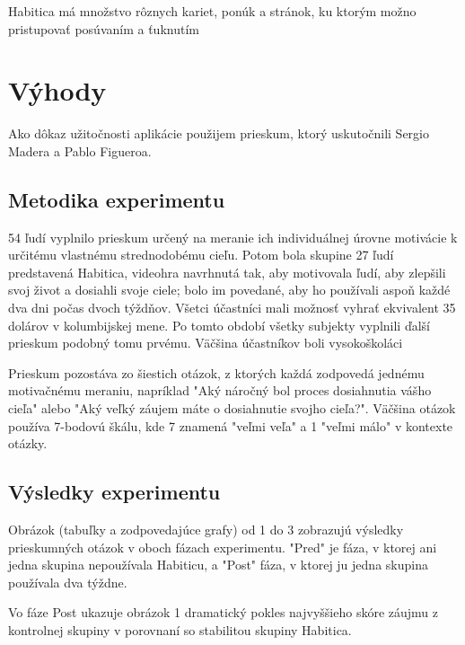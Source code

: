 \documentclass[10pt,twoside,slovak,a4paper]{article}
\begin{document}
Habitica má množstvo rôznych kariet, ponúk a stránok, ku ktorým možno pristupovať posúvaním a ťuknutím

\section{Výhody} \label{benefits}
Ako dôkaz užitočnosti aplikácie použijem prieskum, ktorý uskutočnili Sergio Madera a Pablo Figueroa.\cite{StudyOnPotentialOfVideogames}

\subsection{Metodika experimentu} \label{benefits:methodology}
54 ľudí vyplnilo prieskum určený na meranie ich individuálnej úrovne motivácie k určitému vlastnému strednodobému cieľu. 
Potom bola skupine 27 ľudí predstavená Habitica, videohra navrhnutá tak, aby motivovala ľudí, aby zlepšili svoj život a 
dosiahli svoje ciele; bolo im povedané, aby ho používali aspoň každé dva dni počas dvoch týždňov. 
Všetci účastníci mali možnosť vyhrať ekvivalent 35 dolárov v kolumbijskej mene. Po tomto období 
všetky subjekty vyplnili ďalší prieskum podobný tomu prvému. Väčšina účastníkov boli vysokoškoláci\cite{StudyOnPotentialOfVideogames}

Prieskum pozostáva zo šiestich otázok, z ktorých každá zodpovedá jednému motivačnému meraniu, napríklad 
"Aký náročný bol proces dosiahnutia vášho cieľa" alebo "Aký veľký záujem máte o dosiahnutie svojho cieľa?". 
Väčšina otázok používa 7-bodovú škálu, kde 7 znamená "veľmi veľa" a 1 "veľmi málo" v kontexte otázky.\cite{StudyOnPotentialOfVideogames}

\subsection{Výsledky experimentu} \label{benefits:results}
Obrázok (tabuľky a zodpovedajúce grafy) od 1 do 3 zobrazujú výsledky prieskumných otázok v oboch fázach experimentu. 
"Pred" je fáza, v ktorej ani jedna skupina nepoužívala Habiticu, a 
"Post" fáza, v ktorej ju jedna skupina používala dva týždne.

Vo fáze Post ukazuje obrázok 1 dramatický pokles najvyššieho skóre 
záujmu z kontrolnej skupiny v porovnaní so stabilitou skupiny Habitica.
\end{document}
